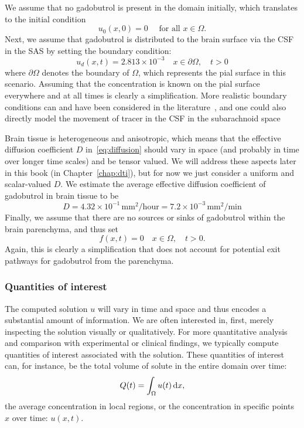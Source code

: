 We assume that no gadobutrol is present in the domain initially,
which translates to the initial condition
\begin{equation}
  \label{eq:chp3:ic}
  u_0(x, 0) = 0 \quad \text{ for all } x \in \Omega.
\end{equation}
Next, we assume that gadobutrol is distributed to the brain surface
via the CSF in the SAS by setting the
boundary condition:
\begin{equation}
  \label{eq:chp3:bc}
  u_d(x, t) = 2.813 \times 10^{-3} \quad x \in \partial \Omega, \quad t > 0
\end{equation}
where $\partial \Omega$ denotes the boundary of $\Omega$, which
represents the pial surface in this scenario. Assuming that the
concentration is known on the pial surface everywhere and at all times
is clearly a simplification. More realistic boundary conditions can
and have been considered in the
literature~\cite{croci2019uncertainty,valnes2020apparent}, and one
could also directly model the movement of tracer in the CSF in the
subarachnoid space~\cite{haga2017numerical,pizzichelli2017numerical}

Brain tissue is heterogeneous and anisotropic, which means that the
effective diffusion coefficient $D$ in~\eqref{eq:diffusion} should vary in
space (and probably in time over longer time scales) and be
tensor valued. We will address these aspects later in this book (in
Chapter~\ref{chap:dti}), but for now we just consider a uniform and
scalar-valued $D$. We estimate the
average effective diffusion coefficient of gadobutrol in brain tissue
to be
\begin{equation}
  D  
  = 4.32 \times 10^{-1} \, \text{mm$^2$/hour}
  = 7.2 \times 10^{-3} \, \text{mm$^2$/min}
\end{equation}
Finally, we assume that there are no sources or sinks of gadobutrol
within the brain parenchyma, and thus set
\begin{equation}
  f(x, t) = 0 \quad x \in \Omega, \quad t > 0.
\end{equation}
Again, this is clearly a simplification that does not account for
potential exit pathways for gadobutrol from the parenchyma.

\subsubsection{Quantities of interest}
The computed solution $u$ will vary in time and space and thus encodes
a substantial amount of information. We are often interested in, first,
merely inspecting the solution visually or qualitatively. For more
quantitative analysis and comparison with experimental or clinical
findings, we typically compute quantities of interest associated with
the solution. These quantities of interest can, for instance, be the
total volume of solute in the entire domain over time:
\begin{equation}
  \label{eq:chp3:qoi}
  Q(t) = \int_{\Omega} u (t) \, \mathrm{d}x, 
\end{equation}
the average concentration in local regions, or the concentration in
specific points $x$ over time: $u(x, t)$.

